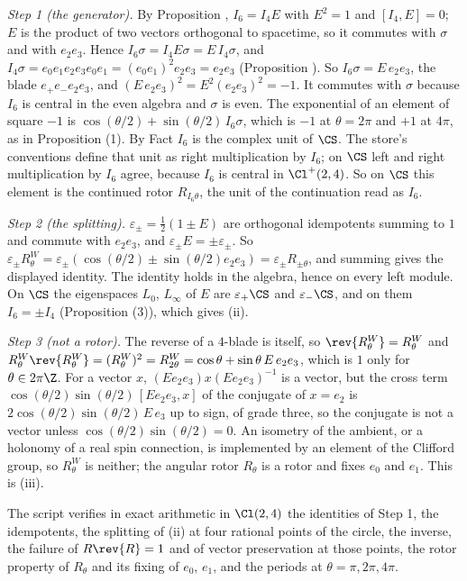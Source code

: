 \emph{Step 1 (the generator).} By Proposition , $I_{6} = I_{4}E$ with $E^{2} = 1$ and $[I_{4}, E] = 0$; $E$ is the product of two vectors orthogonal to spacetime, so it commutes with $\sigma$ and with $e_{2}e_{3}$. Hence $I_{6}\sigma = I_{4}E\sigma = E\,I_{4}\sigma$, and $I_{4}\sigma = e_{0}e_{1}e_{2}e_{3}e_{0}e_{1} = (e_{0}e_{1})^{2}e_{2}e_{3} = e_{2}e_{3}$ (Proposition ). So $I_{6}\sigma = E\,e_{2}e_{3}$, the blade $e_{+}e_{-}e_{2}e_{3}$, and $(E\,e_{2}e_{3})^{2} = E^{2}(e_{2}e_{3})^{2} = -1$. It commutes with $\sigma$ because $I_{6}$ is central in the even algebra and $\sigma$ is even. The exponential of an element of square $-1$ is $\cos(\theta/2) + \sin(\theta/2)\,I_{6}\sigma$, which is $-1$ at $\theta = 2\pi$ and $+1$ at $4\pi$, as in Proposition (1). By Fact  $I_{6}$ is the complex unit of $\CS$. The store's conventions define that unit as right multiplication by $I_{6}$; on $\CS$ left and right multiplication by $I_{6}$ agree, because $I_{6}$ is central in $\Cl^{+}(2,4)$. So on $\CS$ this element is the continued rotor $R_{I_{6}\theta}$, the unit of the continuation read as $I_{6}$.

\emph{Step 2 (the splitting).} $\varepsilon_{\pm} = \tfrac12(1 \pm E)$ are orthogonal idempotents summing to $1$ and commute with $e_{2}e_{3}$, and $\varepsilon_{\pm}E = \pm\varepsilon_{\pm}$. So $\varepsilon_{\pm}R^{W}_{\theta} = \varepsilon_{\pm}(\cos(\theta/2) \pm \sin(\theta/2)e_{2}e_{3}) = \varepsilon_{\pm}R_{\pm\theta}$, and summing gives the displayed identity. The identity holds in the algebra, hence on every left module. On $\CS$ the eigenspaces $L_{0}$, $L_{\infty}$ of $E$ are $\varepsilon_{+}\CS$ and $\varepsilon_{-}\CS$, and on them $I_{6} = \pm I_{4}$ (Proposition (3)), which gives (ii).

\emph{Step 3 (not a rotor).} The reverse of a $4$-blade is itself, so $\rev{R^{W}_{\theta}} = R^{W}_{\theta}$ and $R^{W}_{\theta}\rev{R^{W}_{\theta}} = (R^{W}_{\theta})^{2} = R^{W}_{2\theta} = \cos\theta + \sin\theta\,E\,e_{2}e_{3}$, which is $1$ only for $\theta \in 2\pi\Z$. For a vector $x$, $(E e_{2}e_{3})x(E e_{2}e_{3})^{-1}$ is a vector, but the cross term $\cos(\theta/2)\sin(\theta/2)\,[E e_{2}e_{3}, x]$ of the conjugate of $x = e_{2}$ is $2\cos(\theta/2)\sin(\theta/2)\,E\,e_{3}$ up to sign, of grade three, so the conjugate is not a vector unless $\cos(\theta/2)\sin(\theta/2) = 0$. An isometry of the ambient, or a holonomy of a real spin connection, is implemented by an element of the Clifford group, so $R^{W}_{\theta}$ is neither; the angular rotor $R_{\theta}$ is a rotor and fixes $e_{0}$ and $e_{1}$. This is (iii).

The script  verifies in exact arithmetic in $\Cl(2,4)$ the identities of Step 1, the idempotents, the splitting of (ii) at four rational points of the circle, the inverse, the failure of $R\rev{R} = 1$ and of vector preservation at those points, the rotor property of $R_{\theta}$ and its fixing of $e_{0}$, $e_{1}$, and the periods at $\theta = \pi, 2\pi, 4\pi$.
